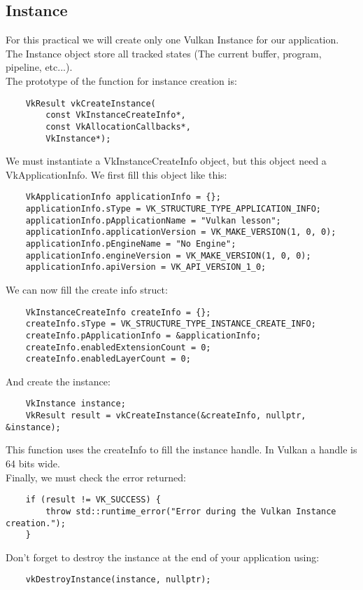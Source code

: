 \documentclass{article}
\begin{document}
\subsection{Instance}
For this practical we will create only one Vulkan Instance for our application. The Instance object store all tracked states (The current buffer, program, pipeline, etc...).\\
The prototype of the function for instance creation is:
\begin{lstlisting}
	VkResult vkCreateInstance(
		const VkInstanceCreateInfo*,
		const VkAllocationCallbacks*,
		VkInstance*);
\end{lstlisting}
We must instantiate a VkInstanceCreateInfo object, but this object need a VkApplicationInfo. We first fill this object like this:
\begin{lstlisting}
	VkApplicationInfo applicationInfo = {};
	applicationInfo.sType = VK_STRUCTURE_TYPE_APPLICATION_INFO;
	applicationInfo.pApplicationName = "Vulkan lesson";
	applicationInfo.applicationVersion = VK_MAKE_VERSION(1, 0, 0);
	applicationInfo.pEngineName = "No Engine";
	applicationInfo.engineVersion = VK_MAKE_VERSION(1, 0, 0);
	applicationInfo.apiVersion = VK_API_VERSION_1_0;
\end{lstlisting}
We can now fill the create info struct:
\begin{lstlisting}
	VkInstanceCreateInfo createInfo = {};
	createInfo.sType = VK_STRUCTURE_TYPE_INSTANCE_CREATE_INFO;
	createInfo.pApplicationInfo = &applicationInfo;
	createInfo.enabledExtensionCount = 0;
	createInfo.enabledLayerCount = 0;
\end{lstlisting}
And create the instance:
\begin{lstlisting}
	VkInstance instance;
	VkResult result = vkCreateInstance(&createInfo, nullptr, &instance);
\end{lstlisting}
This function uses the createInfo to fill the instance handle. In Vulkan a handle is 64 bits wide.\\
Finally, we must check the error returned:
\begin{lstlisting}
	if (result != VK_SUCCESS) {
		throw std::runtime_error("Error during the Vulkan Instance creation.");
	}
\end{lstlisting}
Don't forget to destroy the instance at the end of your application using:
\begin{lstlisting}
	vkDestroyInstance(instance, nullptr);
\end{lstlisting}

\newpage
\end{document}
